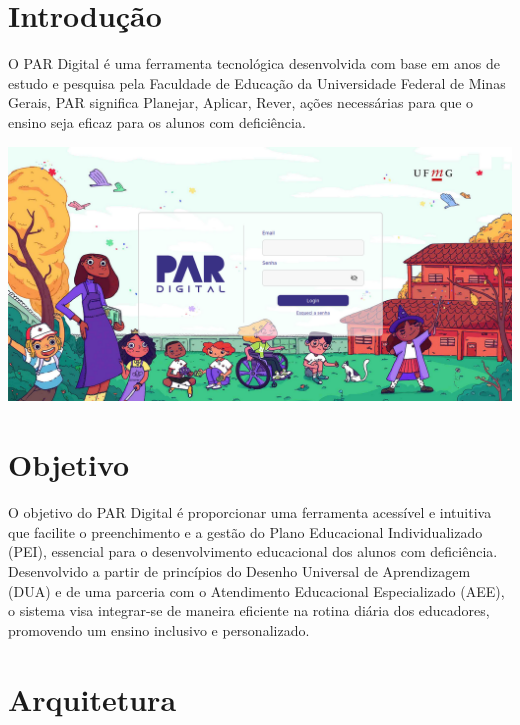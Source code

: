 \documentclass[sigconf]{webmedia}
\begin{document}
\maketitle

\section{Introdução}

O PAR Digital é uma ferramenta tecnológica desenvolvida com base em anos de estudo
e pesquisa pela Faculdade de Educação da Universidade Federal de Minas Gerais, PAR
significa Planejar, Aplicar, Rever, ações necessárias para que o ensino seja eficaz
para os alunos com deficiência.
\vspace{0.5cm}

\includegraphics[scale=0.12]{./imgs/capa}

\section{Objetivo}
O objetivo do PAR Digital é proporcionar uma ferramenta acessível e intuitiva
que facilite o preenchimento e a gestão do Plano Educacional Individualizado (PEI),
essencial para o desenvolvimento educacional dos alunos com deficiência. Desenvolvido
a partir de princípios do Desenho Universal de Aprendizagem (DUA) e de uma parceria
com o Atendimento Educacional Especializado (AEE), o sistema visa integrar-se de
 maneira eficiente na rotina diária dos educadores, promovendo um ensino inclusivo
 e personalizado.
 
 \section{Arquitetura}
 
\end{document}
